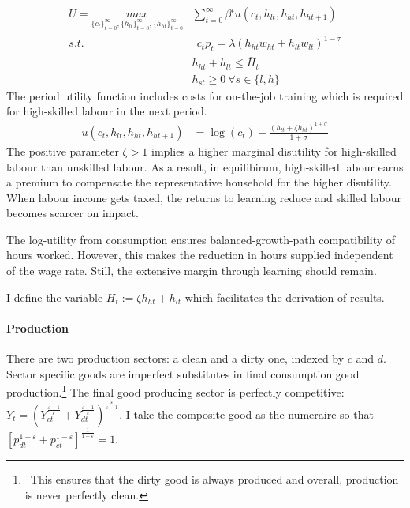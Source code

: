 \begin{align}
U=\underset{\{c_{t}\}_{t=0}^{\infty}, \{h_{lt}\}_{t=0}^{\infty}, \{h_{ht}\}_{t=0}^{\infty}}{max}&
\sum_{t=0}^{\infty}\beta^t u(c_{t}, h_{lt}, h_{ht}, h_{ht+1})\\
s.t.& \ \ c_{t}p_{t}=%
\lambda \left(h_{ht}w_{ht}+h_{lt}w_{lt}\right)^{1-\tau}\\
\ & h_{ht}+h_{lt}\leq \bar{H}_t\\
\ & h_{st}\geq 0 \ \forall s\in \{l,h\}
\end{align}
The period utility function includes costs for on-the-job training which is required for high-skilled labour in the next period. 
\begin{align}
	u(c_{t}, h_{lt}, h_{ht}, h_{ht+1})&= %
	\log(c_t)-\frac{(h_{lt}+\zeta h_{ht})^{1+\sigma}}{1+\sigma}%
\end{align}
The positive parameter $\zeta>1$ implies a higher marginal disutility for high-skilled labour than unskilled labour. As a result, in equilibirum,  
high-skilled labour earns a premium to compensate the representative household for the higher disutility. When labour income gets taxed, the returns to learning reduce and skilled labour becomes scarcer on impact. 

The log-utility from consumption ensures balanced-growth-path compatibility of hours worked. However, this makes the reduction in hours supplied independent of the wage rate. Still, the extensive margin through learning should remain.

I define the variable $H_t:=\zeta h_{ht}+h_{lt}$ which facilitates the derivation of results. 

\paragraph{Production}
There are two production sectors: a clean and a dirty one, indexed by $c$ and $d$. Sector specific goods are imperfect substitutes in final consumption good production.\footnote{\ This ensures that the dirty good is always produced and overall, production is never perfectly clean.}  
The final good producing sector is perfectly competitive:
$Y_t=\left(Y_{ct}^{\frac{\varepsilon-1}{\varepsilon}}+Y_{dt}^{\frac{\varepsilon-1}{\varepsilon}}\right)^\frac{\varepsilon}{\varepsilon-1}$. 
I take the composite good as the numeraire so that $\left[p_{dt}^{1-\varepsilon}+p_{ct}^{1-\varepsilon}\right]^{\frac{1}{1-\varepsilon}}=1$.

